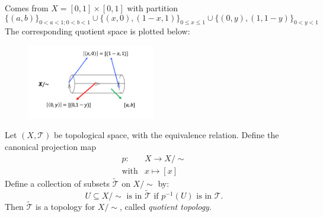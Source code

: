 \begin{example}
Comes from $X=[0,1]\times[0,1]$ with partition 
\[
\{(a,b)\}_{0<a<1;0<b<1}\cup\{(x,0),(1-x,1)\}_{0\le x\le 1}
\cup\{(0,y),(1,1-y)\}_{0<y<1}
\]
The corresponding quotient space is plotted below:
\begin{figure}[H]
\centering
\includegraphics[width=0.5\textwidth]{week5/p_8}
\end{figure}
\end{example}

\begin{proposition}
Let $(X,\mathcal{T})$ be topological space, with the equivalence relation.
Define the canonical projection map
\[
\begin{array}{ll}
p:&X\to X/\sim\\
\text{with}&x\mapsto[x]
\end{array}
\]
Define a collection of subsets $\tilde{\mathcal{T}}$ on $X/\sim$ by:
\[
\text{$U\subseteq X/\sim$ is in $\tilde{\mathcal{T}}$ if $p^{-1}(U)$ is in $\mathcal{T}.$}
\]
Then $\tilde{\mathcal{T}}$ is a topology for $X/\sim$, called \emph{quotient topology}.
\end{proposition}



























